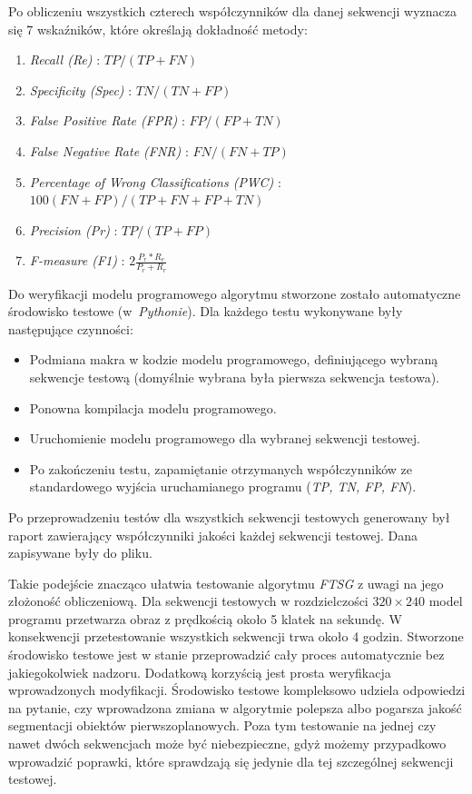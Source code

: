 \documentclass[10pt,a4paper]{article}
\begin{document}
\noindent Po obliczeniu wszystkich czterech współczynników dla danej sekwencji wyznacza się 7 wskaźników, które określają dokładność metody:
%
\begin{enumerate}%
	\item \textit{Recall (Re)} : \tab \small{$TP/(TP+FN)$}
	\item \textit{Specificity (Spec)} : \tab \small{$TN/(TN+FP)$}
	\item \textit{False Positive Rate (FPR)} : \tab \small{$FP/(FP + TN)$}
	\item \textit{False Negative Rate (FNR)} : \tab \small{$FN/(FN + TP)$}
	\item \textit{Percentage of Wrong Classifications (PWC)} : \tab \small{$100(FN + FP)/(TP + FN + FP + TN)$}
	\item \textit{Precision (Pr)} : \tab \small{$TP/(TP + FP)$}
	\item \textit{F-measure (F1)} : \tab \small{$2\frac{P_r*R_e}{P_r+R_r}$}\\
\end{enumerate}

Do weryfikacji modelu programowego algorytmu stworzone zostało automatyczne środowisko testowe (w~\textit{Pythonie}). Dla każdego testu wykonywane były następujące czynności:

\begin{itemize}
	\item Podmiana makra w kodzie modelu programowego, definiującego wybraną sekwencje testową (domyślnie wybrana była pierwsza sekwencja testowa).
	\item Ponowna kompilacja modelu programowego.
	\item Uruchomienie modelu programowego dla wybranej sekwencji testowej.
	\item Po zakończeniu testu, zapamiętanie otrzymanych współczynników ze standardowego wyjścia uruchamianego programu (\textit{TP, TN, FP, FN}).

\end{itemize}

\noindent Po przeprowadzeniu testów dla wszystkich sekwencji testowych generowany był raport zawierający współczynniki jakości każdej sekwencji testowej. Dana zapisywane były do pliku. 

Takie podejście znacząco ułatwia testowanie algorytmu \textit{FTSG} z uwagi na jego złożoność obliczeniową. Dla sekwencji testowych w rozdzielczości $320 \times 240$ model programu przetwarza obraz z prędkością około 5 klatek na sekundę. W konsekwencji przetestowanie wszystkich sekwencji trwa około 4 godzin. Stworzone środowisko testowe jest w stanie przeprowadzić cały proces automatycznie bez jakiegokolwiek nadzoru. Dodatkową korzyścią jest prosta weryfikacja wprowadzonych modyfikacji. Środowisko testowe kompleksowo udziela odpowiedzi na pytanie, czy wprowadzona zmiana w algorytmie polepsza albo pogarsza jakość segmentacji obiektów pierwszoplanowych. Poza tym testowanie na jednej czy nawet dwóch sekwencjach może być niebezpieczne, gdyż możemy przypadkowo wprowadzić poprawki, które sprawdzają się jedynie dla tej szczególnej sekwencji testowej.
\end{document}
